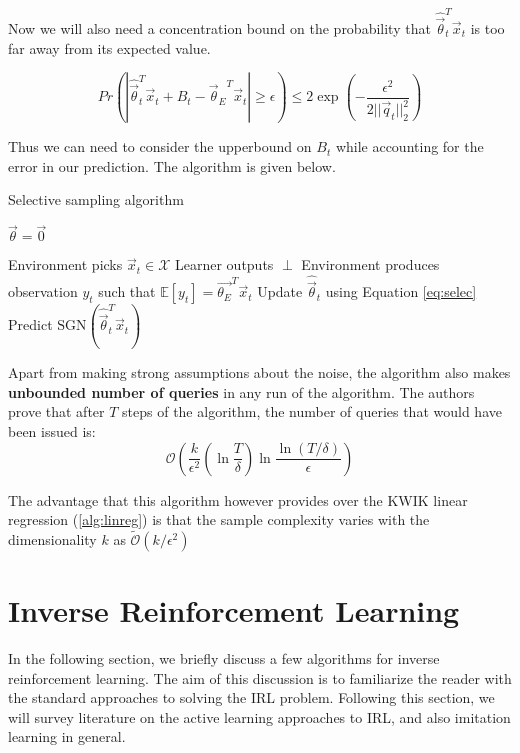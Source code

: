 Now we will also need a concentration bound on the probability that $\hat{\vec{\theta}}_t^T\vec{x}_t$ is too far away from its expected value.

\begin{equation}
Pr\left(|\hat{\vec{\theta}}_t^T\vec{x}_t + B_t - {\vec{\theta}_E}^T\vec{x}_t| \geq \epsilon \right) \leq 2\exp \left( -\frac{\epsilon^2}{2 ||\vec{q}_t||_2^2}\right)
\end{equation}

Thus we can need to consider the upperbound on $B_t$ while accounting for the error in our prediction. The algorithm is given below. 

  
\begin{algorithm}[H]
\caption{Selective sampling algorithm}
\label{alg:selectsampler}
\begin{algorithmic}
	\State $\vec{\theta} = \vec{0}$
	
		\State Environment picks $\vec{x}_t \in \mathcal{X}$
			\State Learner outputs $\perp$
			\State Environment produces observation $y_t$ such that $\mathbb{E}[y_t] = \vec{\theta_E}^T \vec{x}_t$
			\State Update $\hat{\vec{\theta}}_t$ using Equation \eqref{eq:selec}
		\Else
			\State Predict $\text{SGN} (\hat{\vec{\theta}}_t^T \vec{x}_t)$
		\EndIf
    \EndFor
\end{algorithmic}
\end{algorithm}


Apart from making strong assumptions about the noise, the algorithm also makes \textbf{unbounded number of queries} in any run of the algorithm. The authors prove that after $T$ steps of the algorithm, the number of queries that would have been issued is:
\begin{equation}
\mathcal{O}\left( \frac{k}{\epsilon^2} \left(\ln \frac{T}{\delta}\right) \ln \frac{\ln (T/\delta)}{\epsilon}\right)
\end{equation}

The advantage that this algorithm however provides over the KWIK linear regression (\ref{alg:linreg}) is that the sample complexity varies with the dimensionality $k$ as $\tilde{\mathcal{O}}(k/\epsilon^2)$




\section{Inverse Reinforcement Learning}
\label{irlsection}
In the following section, we briefly discuss a few algorithms for inverse reinforcement learning. The aim of this discussion is to familiarize the reader with the standard approaches to solving the IRL problem. Following this section, we will survey literature on the active learning approaches to IRL, and also imitation learning in general.



